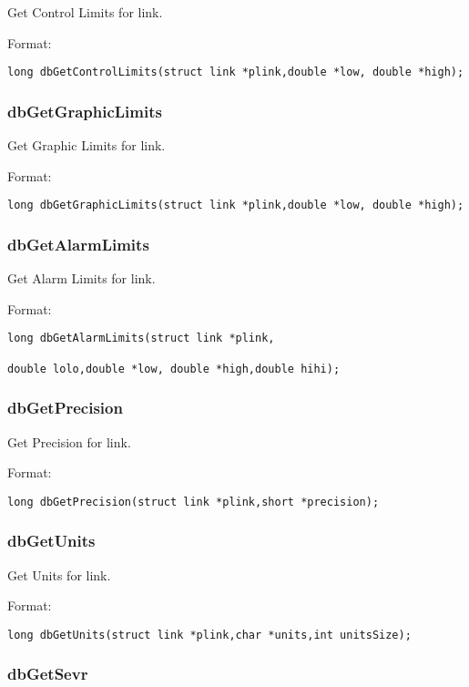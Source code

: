 Get Control Limits for link.

Format:

\begin{verbatim}long dbGetControlLimits(struct link *plink,double *low, double *high);
\end{verbatim}\subsubsection{dbGetGraphicLimits}

Get Graphic Limits for link.

Format:

\begin{verbatim}long dbGetGraphicLimits(struct link *plink,double *low, double *high);
\end{verbatim}\subsubsection{dbGetAlarmLimits}

Get Alarm Limits for link.

Format:

\begin{verbatim}long dbGetAlarmLimits(struct link *plink,

double lolo,double *low, double *high,double hihi);
\end{verbatim}\subsubsection{dbGetPrecision}

Get Precision for link.

Format:

\begin{verbatim}long dbGetPrecision(struct link *plink,short *precision);
\end{verbatim}\subsubsection{dbGetUnits}

Get Units for link.

Format:

\begin{verbatim}long dbGetUnits(struct link *plink,char *units,int unitsSize);
\end{verbatim}\subsubsection{dbGetSevr}

